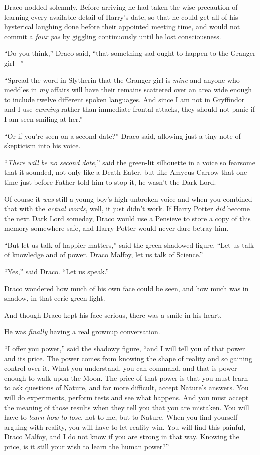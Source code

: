 Draco nodded solemnly. Before arriving he had taken the wise precaution of learning every available detail of Harry's date, so that he could get all of his hysterical laughing done before their appointed meeting time, and would not commit a \emph{faux pas} by giggling continuously until he lost consciousness.

``Do you think,'' Draco said, ``that something sad ought to happen to the Granger girl~-''

``Spread the word in Slytherin that the Granger girl is \emph{mine} and anyone who meddles in \emph{my} affairs will have their remains scattered over an area wide enough to include twelve different spoken languages. And since I am not in Gryffindor and I use \emph{cunning} rather than immediate frontal attacks, they should not panic if I am seen smiling at her.''

``Or if you're seen on a second date?'' Draco said, allowing just a tiny note of skepticism into his voice.

``\emph{There will be no second date,}'' said the green-lit silhouette in a voice so fearsome that it sounded, not only like a Death Eater, but like Amycus Carrow that one time just before Father told him to stop it, he wasn't the Dark Lord.

Of course it \emph{was} still a young boy's high unbroken voice and when you combined that with the \emph{actual words}, well, it just didn't work. If Harry Potter \emph{did} become the next Dark Lord someday, Draco would use a Pensieve to store a copy of this memory somewhere safe, and Harry Potter would never dare betray him.

``But let us talk of happier matters,'' said the green-shadowed figure. ``Let us talk of knowledge and of power. Draco Malfoy, let us talk of Science.''

``Yes,'' said Draco. ``Let us speak.''

Draco wondered how much of his own face could be seen, and how much was in shadow, in that eerie green light.

And though Draco kept his face serious, there was a smile in his heart.

He was \emph{finally} having a real grownup conversation.

``I offer you power,'' said the shadowy figure, ``and I will tell you of that power and its price. The power comes from knowing the shape of reality and so gaining control over it. What you understand, you can command, and that is power enough to walk upon the Moon. The price of that power is that you must learn to ask questions of Nature, and far more difficult, accept Nature's answers. You will do experiments, perform tests and see what happens. And you must accept the meaning of those results when they tell you that you are mistaken. You will have to \emph{learn how to lose}, not to me, but to Nature. When you find yourself arguing with reality, you will have to let reality win. You will find this painful, Draco Malfoy, and I do not know if you are strong in that way. Knowing the price, is it still your wish to learn the human power?''

